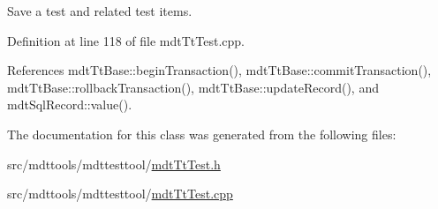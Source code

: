 Save a test and related test items. 



Definition at line 118 of file mdt\-Tt\-Test.\-cpp.



References mdt\-Tt\-Base\-::begin\-Transaction(), mdt\-Tt\-Base\-::commit\-Transaction(), mdt\-Tt\-Base\-::rollback\-Transaction(), mdt\-Tt\-Base\-::update\-Record(), and mdt\-Sql\-Record\-::value().



The documentation for this class was generated from the following files\-:\begin{DoxyCompactItemize}
\item 
src/mdttools/mdttesttool/\hyperlink{mdt_tt_test_8h}{mdt\-Tt\-Test.\-h}\item 
src/mdttools/mdttesttool/\hyperlink{mdt_tt_test_8cpp}{mdt\-Tt\-Test.\-cpp}\end{DoxyCompactItemize}
